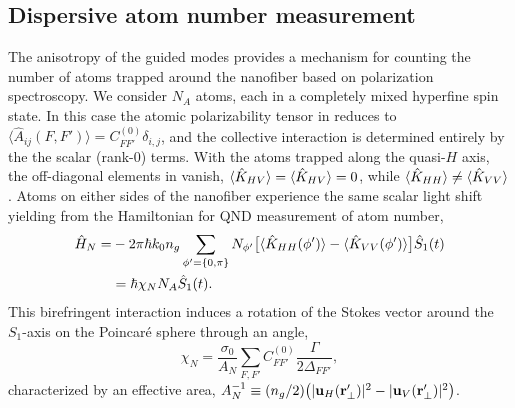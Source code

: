\documentclass[preprint, aps,pra,onecolumn]{revtex4-1} %
\newcommand{\polcomp}{\hat{K}} %
\newcommand{\chiN}{\chi_{N}}
\newcommand{\Abir}{A_N}
\begin{document}
	\subsection{Dispersive atom number measurement} \label{Sec::AtomNumberMeasurement}

The anisotropy of the guided modes provides a mechanism for counting the number of atoms trapped around the nanofiber based on polarization spectroscopy.  
We consider $N_A$ atoms, each in a completely mixed {\color{blue} hyperfine spin} state. In this case the atomic polarizability tensor in  reduces to $\langle \hat{A}_{ij}(F,F') \rangle = C_{FF'}^{(0)} \delta_{i,j}$, and the collective interaction is determined entirely by the the scalar (rank-0) terms.  
With the atoms trapped along the quasi-$H$ axis, the off-diagonal elements in  vanish, $\expt{ \polcomp_{HV} } = \expt{ \polcomp_{HV} } =0$, while $\expt{ \polcomp_{HH} } \neq  \expt{ \polcomp_{VV} }$.  
Atoms on either sides of the nanofiber experience the same scalar light shift yielding from   the Hamiltonian for QND measurement of atom number,
	\begin{align}
		\hat{H}_{N} =& -2\pi \hbar k_0 n_g \sum_{\phi' = \{0,\pi \}} N_{\phi'} \big[ \expt{ \polcomp_{HH}(\phi')}  - \expt{ \polcomp_{VV}(\phi')} \big] \hat{S}_1(t)  \nonumber \\
		& =  \hbar \chiN N_A \hat{S}_1(t).  \label{Eq::MixedHamiltonian}
	\end{align}	
This birefringent interaction induces a rotation of the Stokes vector  around the $S_1$-axis on the Poincar\'{e} sphere through an angle, 
	\begin{equation} \label{Eq::RotationAngle}
		\chiN = \frac{\sigma_0}{\Abir}  \sum_{F,F'}  C_{FF'}^{(0)} \frac{\Gamma}{2 \Delta_{FF'}},
	\end{equation}
characterized by an effective area, $\Abir^{-1} \equiv (n_g/2) \big( |\mathbf{u}_{H}(\br'_\perp)|^2 - |\mathbf{u}_{V}(\br'_\perp)| ^2 \big)$.   
\end{document}
